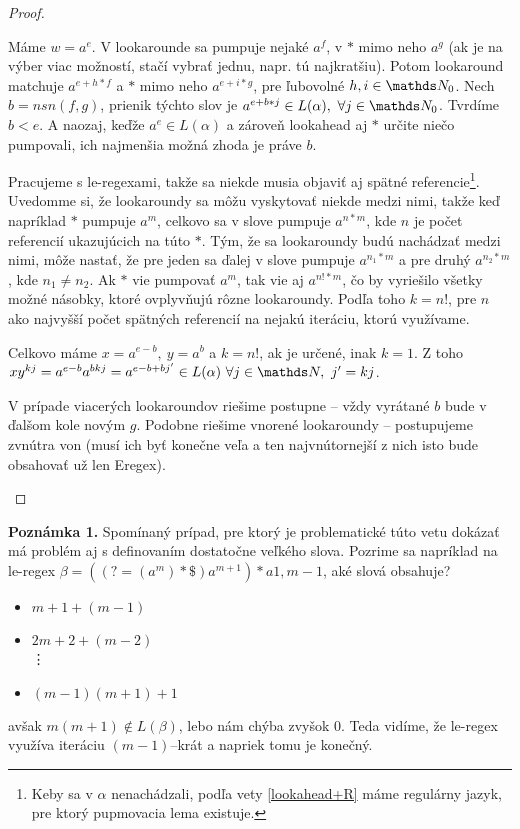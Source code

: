 \begin{proof}
\begin{enumerate}
Máme $w=a^e$. V lookarounde sa pumpuje nejaké $a^f$, v $*$ mimo neho $a^g$ (ak je na výber viac možností, stačí vybrať jednu, napr. tú najkratšiu). Potom lookaround matchuje $a^{e+h*f}$ a $*$ mimo neho $a^{e+i*g}$, pre ľubovolné $h,i \in \N_0$. Nech $b = nsn(f,g)$, prienik týchto slov je $a^{e+b*j} \in L(\alpha), ~ \forall j \in \N_0$. Tvrdíme $b<e$. A naozaj, keďže $a^e \in L(\alpha)$ a zároveň lookahead aj $*$ určite niečo pumpovali, ich najmenšia možná zhoda je práve $b$.

Pracujeme s le-regexami, takže sa niekde musia objaviť aj spätné referencie\footnote{Keby sa v $\alpha$ nenachádzali, podľa vety \ref{lookahead+R} máme regulárny jazyk, pre ktorý pupmovacia lema existuje.}. Uvedomme si, že lookaroundy sa môžu vyskytovať niekde medzi nimi, takže keď napríklad $*$ pumpuje $a^m$, celkovo sa v slove pumpuje $a^{n*m}$, kde $n$ je počet referencií ukazujúcich na túto $*$. Tým, že sa lookaroundy budú nachádzať medzi nimi, môže nastať, že pre jeden sa ďalej v slove pumpuje $a^{n_1*m}$ a pre druhý $a^{n_2*m}$, kde $n_1 \neq n_2$. Ak $*$ vie pumpovať $a^m$, tak vie aj $a^{n!*m}$, čo by vyriešilo všetky možné násobky, ktoré ovplyvňujú rôzne lookaroundy. Podľa toho $k = n!$, pre $n$ ako najvyšší počet spätných referencií na nejakú iteráciu, ktorú využívame.

Celkovo máme $x=a^{e-b},~y=a^b$ a $k = n!$, ak je určené, inak $k=1$. Z toho $xy^{kj} = a^{e-b}a^{bkj} = a^{e-b+bj'} \in L(\alpha) ~ \forall j \in \N, ~ j' = kj$. 

V prípade viacerých lookaroundov riešime postupne -- vždy vyrátané $b$ bude v ďalšom kole novým $g$. Podobne riešime vnorené lookaroundy -- postupujeme zvnútra von (musí ich byť konečne veľa a ten najvnútornejší z nich isto bude obsahovať už len Eregex).
\end{enumerate}
\end{proof}

\textbf{Poznámka 1.}
Spomínaný prípad, pre ktorý je problematické túto vetu dokázať má problém aj s definovaním dostatočne veľkého slova. Pozrime sa napríklad na le-regex $\beta = ((?=(a^m)*\mathdollar )a^{m+1})*a{1,m-1}$, aké slová obsahuje?
\begin{itemize}
\item $m+1+(m-1)$
\item $2m+2+(m-2)$ \\
	  \vdots
\item $(m-1)(m+1)+1$
\end{itemize}
avšak $m(m+1) \notin L(\beta )$, lebo nám chýba zvyšok $0$. Teda vidíme, že le-regex využíva iteráciu $(m-1)$--krát a napriek tomu je konečný.

